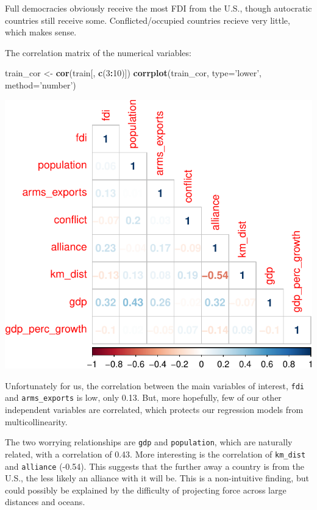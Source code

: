 \documentclass[11pt,]{article}
\newenvironment{Shaded}{\begin{snugshade}}{\end{snugshade}}
\newcommand{\DataTypeTok}[1]{\textcolor[rgb]{0.13,0.29,0.53}{#1}}
\newcommand{\DecValTok}[1]{\textcolor[rgb]{0.00,0.00,0.81}{#1}}
\newcommand{\KeywordTok}[1]{\textcolor[rgb]{0.13,0.29,0.53}{\textbf{#1}}}
\newcommand{\NormalTok}[1]{#1}
\newcommand{\OperatorTok}[1]{\textcolor[rgb]{0.81,0.36,0.00}{\textbf{#1}}}
\newcommand{\StringTok}[1]{\textcolor[rgb]{0.31,0.60,0.02}{#1}}
\begin{document}
Full democracies obviously receive the most FDI from the U.S., though
autocratic countries still receive some. Conflicted/occupied countries
recieve very little, which makes sense.

The correlation matrix of the numerical variables:

\begin{Shaded}
\begin{Highlighting}[]
\NormalTok{train_cor <-}\StringTok{ }\KeywordTok{cor}\NormalTok{(train[, }\KeywordTok{c}\NormalTok{(}\DecValTok{3}\OperatorTok{:}\DecValTok{10}\NormalTok{)])}
\KeywordTok{corrplot}\NormalTok{(train_cor, }\DataTypeTok{type=}\StringTok{'lower'}\NormalTok{, }\DataTypeTok{method=}\StringTok{'number'}\NormalTok{)}
\end{Highlighting}
\end{Shaded}

\includegraphics{report_files/figure-latex/unnamed-chunk-12-1.pdf}

Unfortunately for us, the correlation between the main variables of
interest, \texttt{fdi} and \texttt{arms\_exports} is low, only 0.13.
But, more hopefully, few of our other independent variables are
correlated, which protects our regression models from multicollinearity.

The two worrying relationships are \texttt{gdp} and \texttt{population},
which are naturally related, with a correlation of 0.43. More
interesting is the correlation of \texttt{km\_dist} and
\texttt{alliance} (-0.54). This suggests that the further away a country
is from the U.S., the less likely an alliance with it will be. This is a
non-intuitive finding, but could possibly be explained by the difficulty
of projecting force across large distances and oceans.
\end{document}
